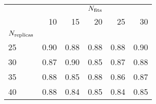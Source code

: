 \begin{center}
    \begin{tabular}{lrrrrr}
        \toprule
        {} & \multicolumn{5}{c}{$N_{\rm fits}$} \\
        {} &   10 &   15 &   20 &   25 &   30 \\
        $N_{\rm replicas}$ &      &      &      &      &      \\
        \midrule
        25            & 0.90 & 0.88 & 0.88 & 0.88 & 0.90 \\
        30            & 0.87 & 0.90 & 0.85 & 0.87 & 0.88 \\
        35            & 0.88 & 0.85 & 0.88 & 0.86 & 0.87 \\
        40            & 0.88 & 0.84 & 0.85 & 0.84 & 0.85 \\
        \bottomrule
        \end{tabular}
\end{center}
